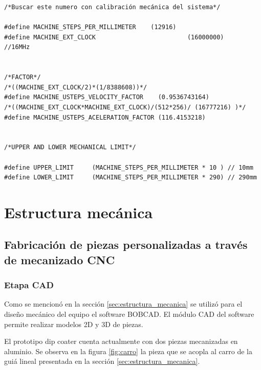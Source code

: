  
 

\begin{lstlisting}[label=cod:vMachine,caption=Macros de desplazamiento y factores de corrección.]  % Start your code-block
/*Buscar este numero con calibración mecánica del sistema*/

#define MACHINE_STEPS_PER_MILLIMETER	(12916)		
#define MACHINE_EXT_CLOCK						  (16000000)	//16MHz


/*FACTOR*/
/*((MACHINE_EXT_CLOCK/2)*(1/8388608))*/	
#define MACHINE_USTEPS_VELOCITY_FACTOR	  (0.9536743164)
/*((MACHINE_EXT_CLOCK*MACHINE_EXT_CLOCK)/(512*256)/ (16777216) )*/
#define MACHINE_USTEPS_ACELERATION_FACTOR (116.4153218)


/*UPPER AND LOWER MECHANICAL LIMIT*/

#define UPPER_LIMIT 	(MACHINE_STEPS_PER_MILLIMETER * 10 ) // 10mm
#define LOWER_LIMIT		(MACHINE_STEPS_PER_MILLIMETER * 290) // 290mm

\end{lstlisting}







\section{Estructura mecánica}
\subsection{Fabricación de piezas personalizadas a través de mecanizado CNC}

\subsubsection{Etapa CAD}

Como se mencionó en la sección \ref{sec:estructura_mecanica} se utilizó para el diseño mecánico del equipo el software BOBCAD. El módulo CAD del software permite realizar modelos 2D y 3D de piezas.

El prototipo dip coater cuenta actualmente con dos piezas mecanizadas en aluminio. Se observa en la figura \ref{fig:carro} la pieza que se acopla al carro de la guiá lineal presentada en la sección \ref{sec:estructura_mecanica}.

